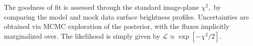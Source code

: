 \documentclass[a4paper,11pt]{article}
\begin{document}

The goodness of fit is assessed through the standard
image-plane $\chi^{2},$ by comparing the model and mock data surface
brightness profiles.  Uncertainties are obtained via MCMC exploration
of the posterior, with the fluxes implicitly marginalized over. The likelihood is simply given by
$\mathcal{L}\propto\exp[-\chi^{2}/2]$.
%
%

%
\end{document}
